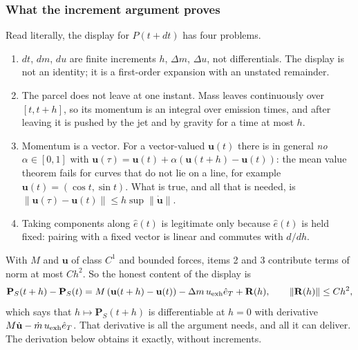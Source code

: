 \subsubsection*{What the increment argument proves}
Read literally, the display for $P(t+dt)$ has four problems.
\begin{enumerate}\itemsep1pt
\item $dt$, $dm$, $du$ are finite increments $h$, $\Delta m$, $\Delta u$,
  not differentials. The display is not an identity; it is a first-order
  expansion with an unstated remainder.
\item The parcel does not leave at one instant. Mass leaves continuously
  over $[t,t+h]$, so its momentum is an integral over emission times, and
  after leaving it is pushed by the jet and by gravity for a time at most
  $h$.
\item Momentum is a vector. For a vector-valued $\mathbf u(t)$ there is in
  general \emph{no} $\alpha\in[0,1]$ with
  $\mathbf u(\tau)=\mathbf u(t)+\alpha(\mathbf u(t+h)-\mathbf u(t))$: the
  mean value theorem fails for curves that do not lie on a line, for
  example $\mathbf u(t)=(\cos t,\sin t)$. What is true, and all that is
  needed, is $\lVert\mathbf u(\tau)-\mathbf u(t)\rVert\le
  h\sup\lVert\dot{\mathbf u}\rVert$.
\item Taking components along $\hat e(t)$ is legitimate only because
  $\hat e(t)$ is held fixed: pairing with a fixed vector is linear and
  commutes with $d/dh$.
\end{enumerate}
With $M$ and $\mathbf u$ of class $C^1$ and bounded forces, items 2 and 3
contribute terms of norm at most $Ch^2$. So the honest content of the
display is
\[
 \mathbf P_S(t+h)-\mathbf P_S(t)
 =M\,(\mathbf u(t+h)-\mathbf u(t))-\Delta m\,u_{\rm exh}\hat e_T
  +\mathbf R(h),
 \qquad \lVert\mathbf R(h)\rVert\le Ch^2,
\]
which says that $h\mapsto\mathbf P_S(t+h)$ is differentiable at $h=0$ with
derivative $M\dot{\mathbf u}-\dot m\,u_{\rm exh}\hat e_T$. That derivative is
all the argument needs, and all it can deliver. The derivation below obtains
it exactly, without increments.

